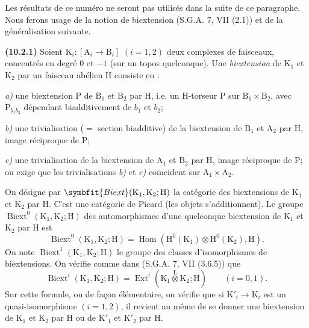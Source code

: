 \documentclass[11pt,leqno]{article}
\begin{document}
Les résultats de ce numéro ne seront pas utilisés dans la suite de ce
paragraphe. Nous ferons usage de la notion de biextension
(S.G.A. 7, VII (2.1)) et de la généralisation suivante.

\textbf{(10.2.1)} Soient
\(\mathrm{K}_i:[\mathrm{A}_i\to\mathrm{B}_i]\) \((i=1,2)\)
deux complexes de faisceaux, concentrés en degré 0 et \(-1\)
(sur un topos quelconque). Une \textit{biextension} de
\(\mathrm{K}_1\) et \(\mathrm{K}_2\) par un faisceau abélien
\(\mathrm{H}\) consiste en :

\noindent \textit{a)} une biextension \(\mathrm{P}\) de
\(\mathrm{B}_1\) et \(\mathrm{B}_2\) par \(\mathrm{H}\), i.e. un
\(\mathrm{H}\)-torseur \(\mathrm{P}\) sur
\(\mathrm{B}_1\times\mathrm{B}_2\), avec
\(\mathrm{P}_{b_1b_2}\) dépendant biadditivement de \(b_1\) et \(b_2\);\par
\noindent \textit{b)} une trivialisation (\(=\) section biadditive)
de la biextension de \(\mathrm{B}_1\) et \(\mathrm{A}_2\) par
\(\mathrm{H}\), image réciproque de \(\mathrm{P}\);\par
\noindent \textit{c)} une trivialisation de la biextension de
\(\mathrm{A}_1\) et \(\mathrm{B}_2\) par \(\mathrm{H}\), image
réciproque de \(\mathrm{P}\); on exige que les trivialisations
\textit{b)} et \textit{c)} coïncident sur
\(\mathrm{A}_1\times\mathrm{A}_2\).

On désigne par
\(\symbfit{Biext}(\mathrm{K}_1,\mathrm{K}_2;\mathrm{H})\)
la catégorie des biextensions de \(\mathrm{K}_1\) et \(\mathrm{K}_2\)
par \(\mathrm{H}\). C’est une catégorie de Picard (les objets
s’additionnent). Le groupe
\(\operatorname{Biext}^0(\mathrm{K}_1,\mathrm{K}_2;\mathrm{H})\)
des automorphismes d’une quelconque biextension de \(\mathrm{K}_1\)
et \(\mathrm{K}_2\) par \(\mathrm{H}\) est
\[
\operatorname{Biext}^0(\mathrm{K}_1,\mathrm{K}_2;\mathrm{H})
=\operatorname{Hom}
(\mathrm{H}^0(\mathrm{K}_1)\otimes\mathrm{H}^0(\mathrm{K}_2),\mathrm{H}).
\]
On note
\(\operatorname{Biext}^1(\mathrm{K}_1,\mathrm{K}_2;\mathrm{H})\)
le groupe des classes d’isomorphismes de biextensions. On vérifie comme
dans (S.G.A. 7, VII (3.6.5)) que
\[
\operatorname{Biext}^i(\mathrm{K}_1,\mathrm{K}_2;\mathrm{H})
=\operatorname{Ext}^i
(\mathrm{K}_1\overset{\mathrm{L}}{\otimes}\mathrm{K}_2;\mathrm{H})
\qquad(i=0,1).
\]
Sur cette formule, ou de façon élémentaire, on vérifie que si
\(\mathrm{K}'_i\to\mathrm{K}_i\) est un quasi-isomorphisme
\((i=1,2)\), il revient au même de se donner une biextension de
\(\mathrm{K}_1\) et \(\mathrm{K}_2\) par \(\mathrm{H}\) ou de
\(\mathrm{K}'_1\) et \(\mathrm{K}'_2\) par \(\mathrm{H}\).
\end{document}

